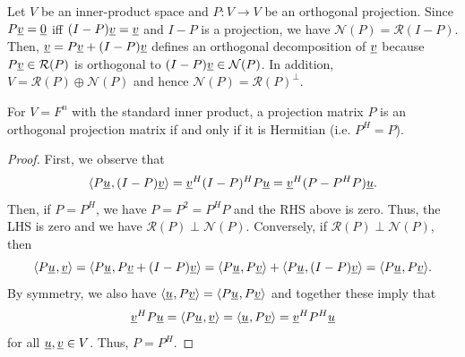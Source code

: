\begin{example}
Let $V$ be an inner-product space and $P \colon V \rightarrow V$ be an orthogonal projection.
Since $P\underline{v}=\underline{0}$ iff $(I-P)\underline{v} = \underline{v}$ and $I-P$ is a projection, we have $\mathcal{N}(P) = \mathcal{R}(I-P)$.
Then, $\underline{v} = P \underline{v} + (I-P) \underline{v}$ defines an orthogonal decomposition of $\underline{v}$ because $P \underline{v} \in \mathcal{R}(P)$ is orthogonal to $(I-P) \underline{v} \in \mathcal{N}(P)$.
In addition, $V = \mathcal{R}(P) \oplus \mathcal{N}(P)$ and hence $\mathcal{N}(P) = \mathcal{R}(P)^{\bot}$.
\end{example}

\begin{theorem}
For $V=F^n$ with the standard inner product, a projection matrix $P$ is an orthogonal projection matrix if and only if it is Hermitian (i.e. $P^H = P$).
\end{theorem}

\begin{proof}
First, we observe that
\begin{equation*}
{\langle  P\underline{u}  \mskip1mu ,  (I-P)\underline{v}  \rangle} = \underline{v}^H (I-P)^H P \underline{u} = \underline{v}^H (P - P^H P) \underline{u}.
\end{equation*}
Then, if $P=P^H$, we have $P = P^2 = P^H P$ and the RHS above is zero.
Thus, the LHS is zero and we have $\mathcal{R}(P) \perp \mathcal{N}(P)$.
Conversely, if $\mathcal{R}(P) \perp \mathcal{N}(P)$, then
\[ {\langle P\underline{u} \mskip1mu , \underline{v} \rangle} = {\langle P\underline{u} \mskip1mu , P\underline{v}+(I-P)\underline{v} \rangle} = {\langle P\underline{u} \mskip1mu , P\underline{v} \rangle} + {\langle P\underline{u} \mskip1mu , (I-P)\underline{v} \rangle} = {\langle P \underline{u} \mskip1mu , P \underline{v} \rangle}. \]
By symmetry, we also have ${\langle \underline{u} \mskip1mu , P \underline{v} \rangle} = {\langle P\underline{u} \mskip1mu , P \underline{v} \rangle}$
and together these imply that
\[  \underline{v}^H P \underline{u} = {\langle P \underline{u} \mskip1mu , \underline{v} \rangle} = {\langle \underline{u} \mskip1mu , P\underline{v} \rangle} = \underline{v}^H P^H \underline{u} \]
for all $\underline{u},\underline{v} \in V$.
Thus, $P = P^H$.
\end{proof}



